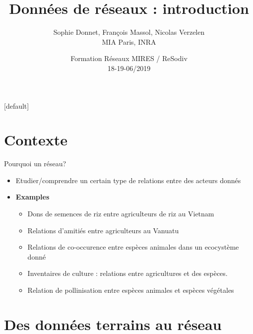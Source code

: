 \documentclass[compress,10pt]{beamer}
\title[Formation Réseaux 06/2019]{ Données de réseaux : introduction }
\author[Donnet, Massol, Verzelen]{ Sophie Donnet, François Massol, Nicolas Verzelen\\ MIA Paris, INRA}
\date{Formation Réseaux MIRES / ReSodiv\\ 18-19-06/2019}
\begin{document}
\begin{frame}
\titlepage
\end{frame}

[default]

\section[Contexte]{Contexte}


\begin{frame}{Pourquoi un réseau?}

\begin{itemize}
\item Etudier/comprendre un \textcolor{dgreen}{certain type de  relations} entre des 
\textcolor{dgreen}{acteurs donnés}
\item \textbf{Examples}
\begin{itemize}
\item Dons de semences de riz entre agriculteurs de riz au Vietnam
\item Relations d'amitiés entre agriculteurs au Vanuatu
\item Relations de co-occurence entre espèces animales dans un ecocystème donné
\item Inventaires de culture : relations entre agricultures et des espèces. 
\item Relation de pollinisation entre espèces animales et espèces végétales
\end{itemize}
\end{itemize}
\end{frame}



\section{Des données terrains au réseau}
\end{document}
